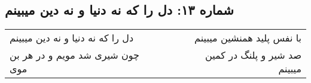 \begin{center}
\section*{شماره ۱۳: دل را که نه دنیا و نه دین میبینم}
\label{sec:013}
\begin{longtable}{l p{0.5cm} r}
دل را که نه دنیا و نه دین میبینم
&&
با نفس پلید همنشین میبینم
\\
چون شیری شد مویم و در هر بن موی
&&
صد شیر و پلنگ در کمین میبینم
\\
\end{longtable}
\end{center}
